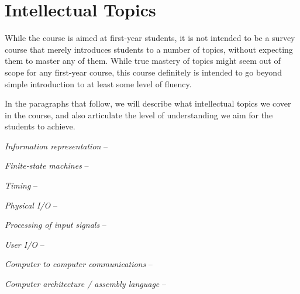 \section{Intellectual Topics}
\label{sec:topics}

While the course is aimed at first-year students, it is not intended
to be a survey course that merely introduces students to a number of
topics, without expecting them to master any of them.
While true mastery of topics might seem out of scope for
any first-year course, this course definitely is intended to go
beyond simple introduction to at least some level of fluency.

In the paragraphs that follow, we will describe what intellectual
topics we cover in the course, and also articulate the level
of understanding we aim for the students to achieve.

\emph{Information representation} --

\emph{Finite-state machines} --

\emph{Timing} --

\emph{Physical I/O} --

\emph{Processing of input signals} --

\emph{User I/O} --

\emph{Computer to computer communications} --

\emph{Computer architecture / assembly language} --

